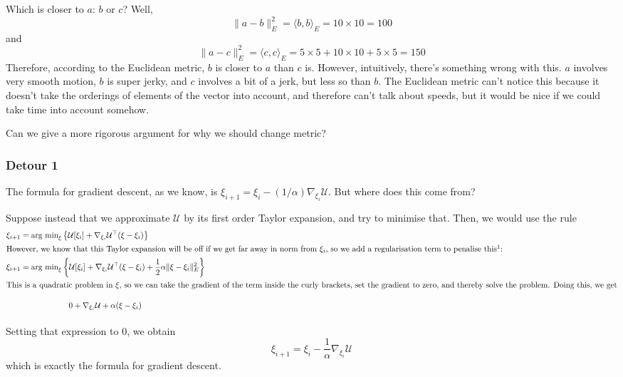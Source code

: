 \documentclass[twoside]{article}
\newcommand{\cu}{\mathcal{U}}
\begin{document}
Which is closer to $a$: $b$ or $c$? Well,
\begin{equation}
  \label{eq:4}
  \|a - b \|^2_E = \langle b, b \rangle_E = 10 \times 10 = 100
\end{equation}
and
\begin{equation}
  \label{eq:5}
  \|a - c \|^2_E = \langle c, c \rangle_E = 5 \times 5 + 10 \times 10 + 5 \times 5 = 150
\end{equation}
Therefore, according to the Euclidean metric, $b$ is closer to $a$ than $c$ is. However, intuitively, there's something wrong with this. $a$ involves very smooth motion, $b$ is super jerky, and $c$ involves a bit of a jerk, but less so than $b$. The Euclidean metric can't notice this because it doesn't take the orderings of elements of the vector into account, and therefore can't talk about speeds, but it would be nice if we could take time into account somehow.

Can we give a more rigorous argument for why we should change metric?

\subsubsection{Detour 1}
\label{sec:detour-1-1}

The formula for gradient descent, as we know, is $\xi_{i+1} = \xi_i - (1/\alpha)\nabla_{\xi_i}\cu$. But where does this come from?

Suppose instead that we approximate $\cu$ by its first order Taylor expansion, and try to minimise that. Then, we would use the rule
\begin{align}
  \label{eq:6}
  \xi_{i+1} &= \text{arg min}_{\xi} \left\{ \cu[\xi_i] + \nabla_{\xi_i}\cu^{\top} (\xi - \xi_i)\right\}\\
  \intertext{However, we know that this Taylor expansion will be off if we get far away in norm from $\xi_i$, so we add a regularisation term to penalise this\footnotemark:}
  \xi_{i+1} &= \text{arg min}_{\xi} \left\{ \cu[\xi_i] + \nabla_{\xi_i}\cu^{\top} (\xi - \xi_i) + \frac{1}{2} \alpha \|\xi - \xi_i \|_E^2 \right\}\label{eq:7} \\
  \intertext{This is a quadratic problem in $\xi$, so we can take the gradient of the term inside the curly brackets, set the gradient to zero, and thereby solve the problem. Doing this, we get}
  &\phantom{= \text{arg min}_\xi \Bigg\{\,\, }0 + \nabla_{\xi_i}\cu + \alpha (\xi - \xi_i)\label{eq:9}
\end{align}
Setting that expression to 0, we obtain
\begin{equation}
  \label{eq:10}
  \xi_{i+1} = \xi_i - \frac{1}{\alpha} \nabla_{\xi_i} \cu
\end{equation}
which is exactly the formula for gradient descent.
\end{document}
